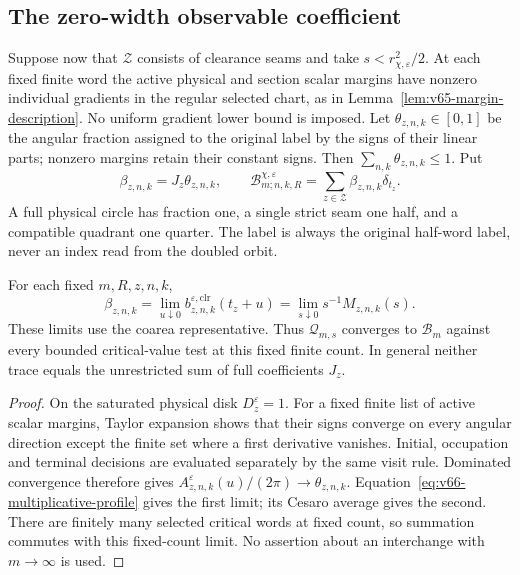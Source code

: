 \subsection{The zero-width observable coefficient}
Suppose now that $\mathcal Z$ consists of clearance seams and take
$s<r_{\chi,\varepsilon}^2/2$. At each fixed finite word the active
physical and section scalar margins have nonzero individual gradients
in the regular selected chart, as in
Lemma~\ref{lem:v65-margin-description}. No uniform gradient lower
bound is imposed. Let $\theta_{z,n,k}\in[0,1]$ be the angular fraction
assigned to the original label by the signs of their linear parts;
nonzero margins retain their constant signs. Then
$\sum_{n,k}\theta_{z,n,k}\le1$. Put
\begin{equation}\label{eq:v66-observable-atomic-trace}
 \beta_{z,n,k}=J_z\theta_{z,n,k},\qquad
 \mathcal B^{\chi,\varepsilon}_{m;n,k,R}
                     =\sum_{z\in\mathcal Z}\beta_{z,n,k}\delta_{t_z}.
\end{equation}
A full physical circle has fraction one, a single strict seam one half,
and a compatible quadrant one quarter. The label is always the
original half-word label, never an index read from the doubled orbit.

\begin{proposition}
\label{prop:v66-fixed-count-trace}
For each fixed $m,R,z,n,k$,
\begin{equation}\label{eq:v66-fixed-count-trace}
 \beta_{z,n,k}
   =\lim_{u\downarrow0}b_{z,n,k}^{\varepsilon,\mathrm{clr}}(t_z+u)
   =\lim_{s\downarrow0}s^{-1}M_{z,n,k}(s).
\end{equation}
These limits use the coarea representative. Thus $\mathcal Q_{m,s}$
converges to $\mathcal B_m$ against every bounded critical-value test
at this fixed finite count. In general neither trace equals the
unrestricted sum of full coefficients $J_z$.
\end{proposition}
\begin{proof}
On the saturated physical disk $D_z^\varepsilon=1$. For a fixed
finite list of active scalar margins, Taylor expansion shows that
their signs converge on every angular direction except the finite
set where a first derivative vanishes. Initial, occupation and
terminal decisions are evaluated separately by the same visit rule.
Dominated convergence therefore gives
$A_{z,n,k}^{\varepsilon}(u)/(2\pi)\to\theta_{z,n,k}$.
Equation~\eqref{eq:v66-multiplicative-profile} gives the first limit;
its Cesaro average gives the second. There are finitely many selected
critical words at fixed count, so summation commutes with this fixed-count
limit. No assertion about an interchange with $m\to\infty$ is used.
\end{proof}

